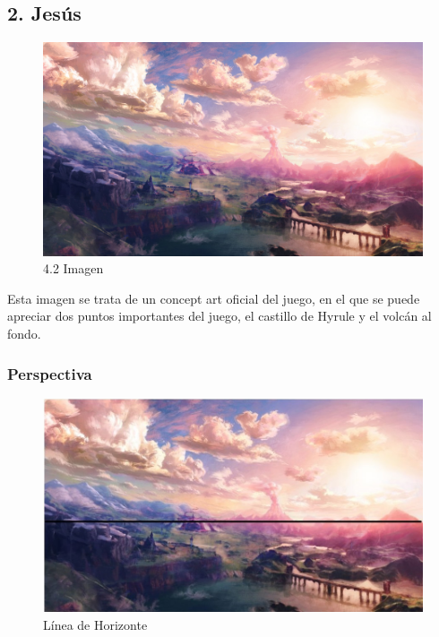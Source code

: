 \documentclass[12pt]{article}
\begin{document}

    \subsection{2. Jesús}

        \begin{figure}[H]
          \centering
          \includegraphics[scale = 0.2]{images/Concepts/2_concept_art.jpg}
          \caption{\small{4.2 Imagen}}
        \end{figure}
        
        Esta imagen se trata de un concept art oficial del juego, en el que se puede apreciar dos puntos importantes del juego, el castillo de Hyrule y el volcán al fondo. 

        \subsubsection{Perspectiva}
        \begin{figure}[H]
          \centering
          \includegraphics[scale = 0.4]{Jesus/Seccion2/Group 4.JPEG}
          \caption{Línea de Horizonte}
        \end{figure}
\end{document}
